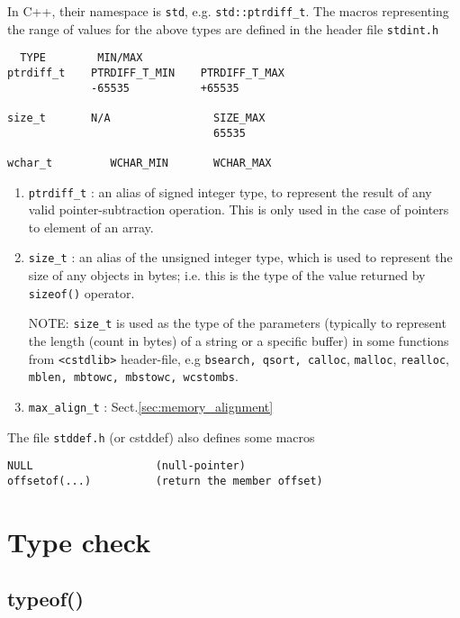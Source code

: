 In C++, their namespace is \verb!std!, e.g. \verb!std::ptrdiff_t!. 
The macros representing the range of values for the above types are defined in
the header file \verb!stdint.h!
\begin{verbatim}
  TYPE        MIN/MAX
ptrdiff_t    PTRDIFF_T_MIN    PTRDIFF_T_MAX
             -65535           +65535

size_t       N/A                SIZE_MAX
                                65535
                                
wchar_t         WCHAR_MIN       WCHAR_MAX

\end{verbatim}


\begin{enumerate}
  \item \verb!ptrdiff_t! : an alias of signed integer type, to represent the
  result of any valid pointer-subtraction operation. This is only used in the
  case of pointers to element of an array.
  
  \item \verb!size_t! : an alias of the unsigned integer type, which is used to
  represent the size of any objects in bytes; i.e. this is the type of the value
  returned by \verb!sizeof()! operator.
  
NOTE: \verb!size_t! is used as the type of the parameters (typically to
represent the length (count in bytes) of a string or a specific buffer) in some
functions from \verb!<cstdlib>! header-file, e.g \verb!bsearch, qsort, calloc!,
\verb!malloc!, \verb!realloc!, \verb!mblen, mbtowc, mbstowc, wcstombs!.

  \item \verb!max_align_t! :  Sect.\ref{sec:memory_alignment}
  
\end{enumerate}

The file \verb!stddef.h! (or cstddef) also defines some macros
\begin{verbatim}
NULL                   (null-pointer)
offsetof(...)          (return the member offset)
\end{verbatim}

\section{Type check}


\subsection{typeof()}
\label{sec:typeof}

